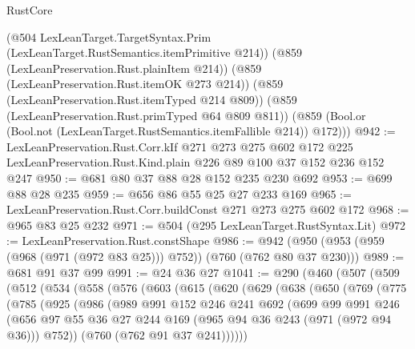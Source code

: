 \begin{lexlean}{RustCore}
\begin{coremodule}
      (@504 LexLeanTarget.TargetSyntax.Prim (LexLeanTarget.RustSemantics.itemPrimitive @214))
      (@859 (LexLeanPreservation.Rust.plainItem @214))
      (@859 (LexLeanPreservation.Rust.itemOK @273 @214))
      (@859 (LexLeanPreservation.Rust.itemTyped @214 @809))
      (@859 (LexLeanPreservation.Rust.primTyped @64 @809 @811))
      (@859 (Bool.or (Bool.not (LexLeanTarget.RustSemantics.itemFallible @214)) @172)))
@942 := LexLeanPreservation.Rust.Corr.kIf
    @271
    @273
    @275
    @602
    @172
    @225
    LexLeanPreservation.Rust.Kind.plain
    @226
    @89
    @100
    @37
    @152
    @236
    @152
    @247
@950 := @681 @80 @37 @88 @28 @152 @235 @230 @692
@953 := @699 @88 @28 @235
@959 := @656 @86 @55 @25 @27 @233 @169
@965 := LexLeanPreservation.Rust.Corr.buildConst @271 @273 @275 @602 @172
@968 := @965 @83 @25 @232
@971 := @504 (@295 LexLeanTarget.RustSyntax.Lit)
@972 := LexLeanPreservation.Rust.constShape
@986 := @942 (@950 (@953 (@959 (@968 (@971 (@972 @83 @25))) @752)) (@760 (@762 @80 @37 @230)))
@989 := @681 @91 @37 @99
@991 := @24 @36 @27
@1041 := @290
    (@460
      (@507
        (@509
          (@512
            (@534
              (@558
                (@576
                  (@603
                    (@615
                      (@620
                        (@629
                          (@638
                            (@650
                              (@769
                                (@775
                                  (@785
                                    (@925
                                      (@986
                                        (@989
                                          @991
                                          @152
                                          @246
                                          @241
                                          @692
                                          (@699
                                            @99
                                            @991
                                            @246
                                            (@656
                                              @97
                                              @55
                                              @36
                                              @27
                                              @244
                                              @169
                                              (@965 @94 @36 @243 (@971 (@972 @94 @36)))
                                              @752))
                                          (@760 (@762 @91 @37 @241))))))

\end{coremodule}
\end{lexlean}
